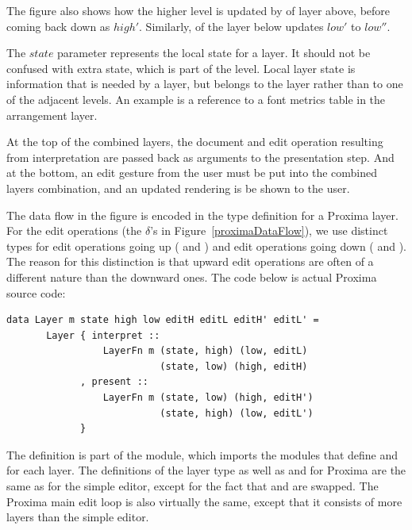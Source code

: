 \documentclass[preprint,natbib]{sigplanconf}
\begin{document}
The figure also shows how the higher level is updated by  of layer above, before coming back down as $high'$. Similarly,  of the layer below updates $low'$ to $low''$. 

The $state$ parameter represents the local state for a layer. It should not be confused with extra state, which is part of the level. Local layer state is information that is needed by a layer, but belongs to the layer rather than to one of the adjacent levels. An example is a reference to a font metrics table in the arrangement layer.

At the top of the combined layers, the document and edit operation resulting from interpretation are passed back as arguments to the presentation step. And at the bottom, an edit gesture from the user must be put into the combined layers combination, and an updated rendering is be shown to the user. 
\ec

The data flow in the figure is encoded in the type definition for a Proxima layer. For the edit operations (the $\delta$'s in Figure~\ref{proximaDataFlow}), we use distinct types for edit operations going up ( and ) and edit operations going down ( and ). The reason for this distinction is that upward edit operations are often of a different nature than the downward ones. The code below is actual Proxima source code:

\begin{small}
\begin{verbatim}
data Layer m state high low editH editL editH' editL' =
       Layer { interpret ::
                 LayerFn m (state, high) (low, editL)
                           (state, low) (high, editH)
             , present ::
                 LayerFn m (state, low) (high, editH')
                           (state, high) (low, editL')
             }
\end{verbatim}
\end{small}

The  definition is part of the  module, which imports the modules that define  and  for each layer. The definitions of the layer type as well as  and  for Proxima are the same as for the simple editor, except for the fact that  and  are swapped. The Proxima main edit loop is also virtually the same, except that it consists of more layers than the simple editor.


\bc
\bigskip
\end{document}
